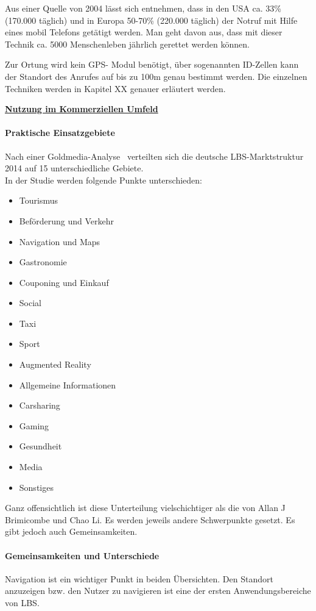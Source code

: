 Aus einer Quelle von 2004 lässt sich entnehmen, dass in den USA ca. 33\% (170.000 täglich) und in Europa 50-70\% (220.000 täglich) der Notruf mit Hilfe eines mobil Telefons getätigt werden. Man geht davon aus, dass mit dieser Technik ca. 5000 Menschenleben jährlich gerettet werden können.

Zur Ortung wird kein GPS- Modul benötigt, über sogenannten ID-Zellen kann der Standort des Anrufes auf bis zu 100m genau bestimmt werden. Die einzelnen Techniken werden in Kapitel XX genauer erläutert werden. 


\textbf{ \underline{Nutzung im Kommerziellen Umfeld } }

\paragraph{Praktische Einsatzgebiete}
Nach einer Goldmedia-Analyse~\cite[S.9]{goldmedia:lbs} verteilten sich die deutsche LBS-Marktstruktur 2014 auf 15 unterschiedliche Gebiete.\\
In der Studie werden folgende Punkte unterschieden:
\begin{itemize}
	\item Tourismus
	\item Beförderung und Verkehr
	\item Navigation und Maps
	\item Gastronomie
	\item Couponing und Einkauf
	\item Social
	\item Taxi
	\item Sport
	\item Augmented Reality
	\item Allgemeine Informationen
	\item Carsharing
	\item Gaming
	\item Gesundheit
	\item Media
	\item Sonstiges
\end{itemize}
Ganz offensichtlich ist diese Unterteilung vielschichtiger als die von Allan J Brimicombe und Chao Li. Es werden jeweils andere Schwerpunkte gesetzt. Es gibt jedoch auch Gemeinsamkeiten.

\paragraph{Gemeinsamkeiten und Unterschiede}
Navigation ist ein wichtiger Punkt in beiden Übersichten. Den Standort anzuzeigen bzw. den Nutzer zu navigieren ist eine der ersten Anwendungsbereiche von LBS.